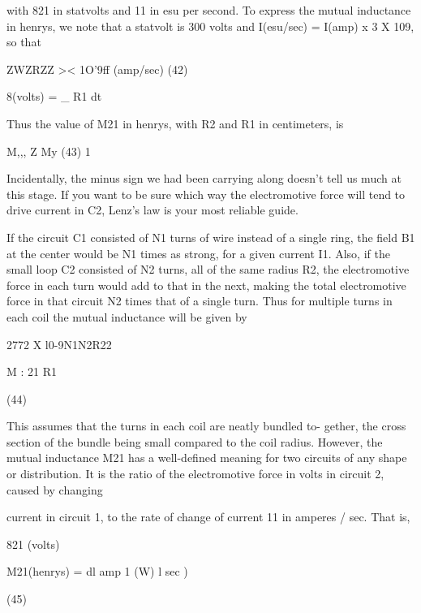  

with 821 in statvolts and 11 in esu per second. To express the mutual
inductance in henrys, we note that a statvolt is 300 volts and
I(esu/sec) = I(amp) x 3 X 109, so that

\begin{equation}
\end{equation}
ZWZRZZ >< 1O'9ff (amp/sec) (42)

8(volts) = _ R1 dt

Thus the value of M21 in henrys, with R2 and R1 in centimeters, is

\begin{equation}
\end{equation}
M,,, Z My (43)
1

Incidentally, the minus sign we had been carrying along doesn't tell
us much at this stage. If you want to be sure which way the electromotive
force will tend to drive current in C2, Lenz's law is your most
reliable guide.

If the circuit C1 consisted of N1 turns of wire instead of a single
ring, the field B1 at the center would be N1 times as strong, for a given
current I1. Also, if the small loop C2 consisted of N2 turns, all of the
same radius R2, the electromotive force in each turn would add to
that in the next, making the total electromotive force in that circuit
N2 times that of a single turn. Thus for multiple turns in each coil
the mutual inductance will be given by

\begin{equation}
\end{equation}
2772 X l0-9N1N2R22

M :
21 R1

(44)

This assumes that the turns in each coil are neatly bundled to-
gether, the cross section of the bundle being small compared to the
coil radius. However, the mutual inductance M21 has a well-defined
meaning for two circuits of any shape or distribution. It is the ratio
of the electromotive force in volts in circuit 2, caused by changing

current in circuit 1, to the rate of change of current 11 in amperes / sec.
That is,

\begin{equation}
\end{equation}
821 (volts)

M21(henrys) = dl amp
1
(W) l sec )

(45)

